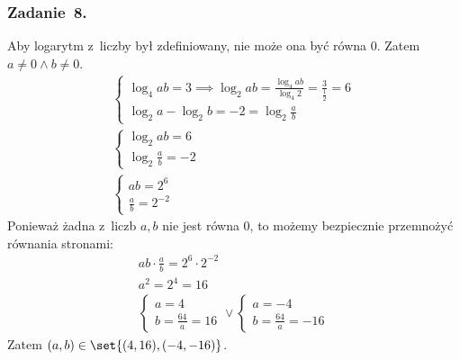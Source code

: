 \subsubsection*{Zadanie~8.}
Aby logarytm z~liczby był zdefiniowany, nie może ona być równa \(0\). Zatem \(a \neq 0 \land b \neq 0\).
\begin{gather*}
    \begin{cases}
        \log_{4}{ab} = 3 \implies \log_{2}{ab} = \frac{\log_{4}{ab}}{\log_{4}{2}} = \frac{3}{\frac{1}{2}} = 6\\
        \log_{2}{a} - \log_{2}{b} = -2 = \log_{2}{\frac{a}{b}}
    \end{cases}\\
    \begin{cases}
        \log_{2}{ab} = 6\\
        \log_{2}{\frac{a}{b}} = -2
    \end{cases}\\
    \begin{cases}
        ab = 2^6\\
        \frac{a}{b} = 2^{-2}
    \end{cases}
\end{gather*}
Ponieważ żadna z~liczb \(a, b\) nie jest równa \(0\), to możemy bezpiecznie przemnożyć równania stronami:
\begin{gather*}
    ab \cdot \frac{a}{b} = 2^6 \cdot 2^{-2}\\
    a^2 = 2^4 = 16\\
    \begin{cases}
        a = 4\\
        b = \frac{64}{a} = 16
    \end{cases}
    \lor
    \begin{cases}
        a = -4\\
        b = \frac{64}{a} = -16
    \end{cases}
\end{gather*}
Zatem \((a, b) \in \set{(4, 16), (-4, -16)}\).
